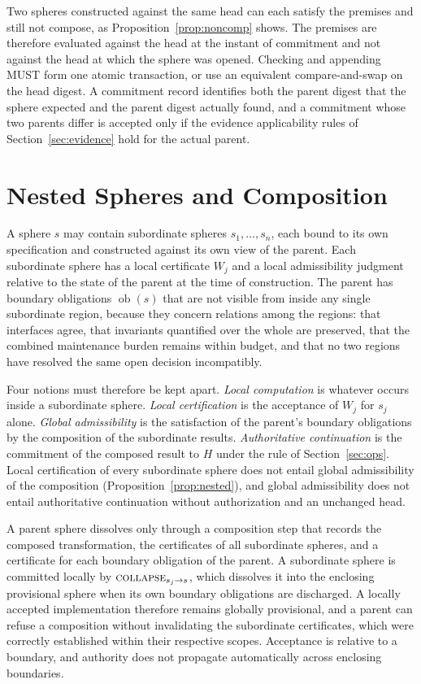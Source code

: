 \documentclass[11pt]{article}
\theoremstyle{remark}
\newcommand{\COLLAPSE}{\textsc{collapse}}
\begin{document}
Two spheres constructed against the same head can each satisfy the premises and still not compose, as Proposition~\ref{prop:noncomp} shows. The premises are therefore evaluated against the head at the instant of commitment and not against the head at which the sphere was opened. Checking and appending MUST form one atomic transaction, or use an equivalent compare-and-swap on the head digest. A commitment record identifies both the parent digest that the sphere expected and the parent digest actually found, and a commitment whose two parents differ is accepted only if the evidence applicability rules of Section~\ref{sec:evidence} hold for the actual parent.

\section{Nested Spheres and Composition}\label{sec:nested}

A sphere $s$ may contain subordinate spheres $s_1,\dots,s_n$, each bound to its own specification and constructed against its own view of the parent. Each subordinate sphere has a local certificate $W_j$ and a local admissibility judgment relative to the state of the parent at the time of construction. The parent has boundary obligations $\operatorname{ob}(s)$ that are not visible from inside any single subordinate region, because they concern relations among the regions: that interfaces agree, that invariants quantified over the whole are preserved, that the combined maintenance burden remains within budget, and that no two regions have resolved the same open decision incompatibly.

Four notions must therefore be kept apart. \emph{Local computation} is whatever occurs inside a subordinate sphere. \emph{Local certification} is the acceptance of $W_j$ for $s_j$ alone. \emph{Global admissibility} is the satisfaction of the parent's boundary obligations by the composition of the subordinate results. \emph{Authoritative continuation} is the commitment of the composed result to $H$ under the rule of Section~\ref{sec:ops}. Local certification of every subordinate sphere does not entail global admissibility of the composition (Proposition~\ref{prop:nested}), and global admissibility does not entail authoritative continuation without authorization and an unchanged head.

A parent sphere dissolves only through a composition step that records the composed transformation, the certificates of all subordinate spheres, and a certificate for each boundary obligation of the parent. A subordinate sphere is committed locally by $\COLLAPSE_{s_j\to s}$, which dissolves it into the enclosing provisional sphere when its own boundary obligations are discharged. A locally accepted implementation therefore remains globally provisional, and a parent can refuse a composition without invalidating the subordinate certificates, which were correctly established within their respective scopes. Acceptance is relative to a boundary, and authority does not propagate automatically across enclosing boundaries.
\end{document}
